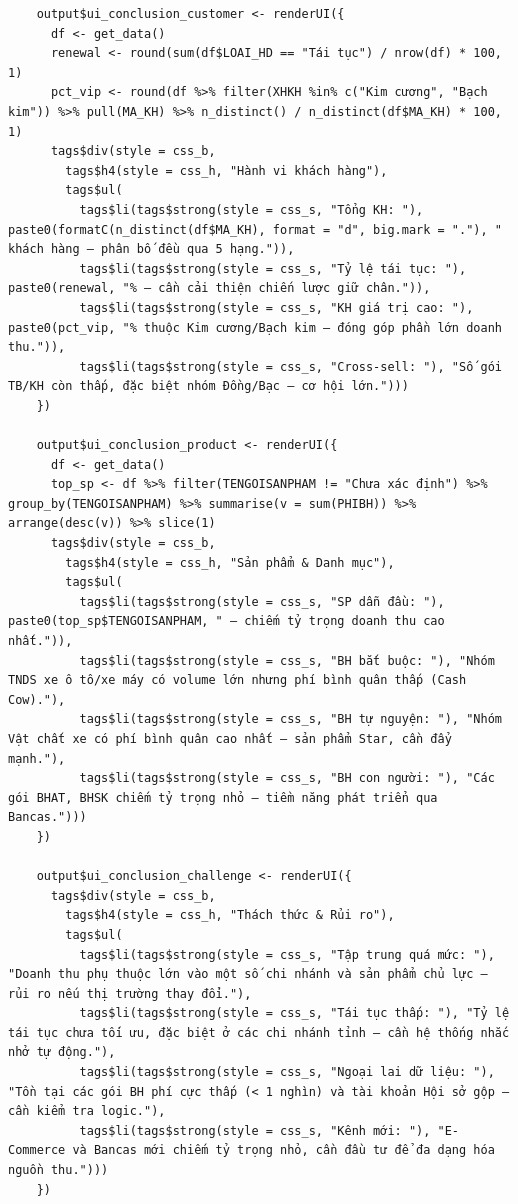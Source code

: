 \documentclass[12pt, a4paper]{article}
\begin{document}
\begin{lstlisting}
    output$ui_conclusion_customer <- renderUI({
      df <- get_data()
      renewal <- round(sum(df$LOAI_HD == "Tái tục") / nrow(df) * 100, 1)
      pct_vip <- round(df %>% filter(XHKH %in% c("Kim cương", "Bạch kim")) %>% pull(MA_KH) %>% n_distinct() / n_distinct(df$MA_KH) * 100, 1)
      tags$div(style = css_b,
        tags$h4(style = css_h, "Hành vi khách hàng"),
        tags$ul(
          tags$li(tags$strong(style = css_s, "Tổng KH: "), paste0(formatC(n_distinct(df$MA_KH), format = "d", big.mark = "."), " khách hàng — phân bố đều qua 5 hạng.")),
          tags$li(tags$strong(style = css_s, "Tỷ lệ tái tục: "), paste0(renewal, "% — cần cải thiện chiến lược giữ chân.")),
          tags$li(tags$strong(style = css_s, "KH giá trị cao: "), paste0(pct_vip, "% thuộc Kim cương/Bạch kim — đóng góp phần lớn doanh thu.")),
          tags$li(tags$strong(style = css_s, "Cross-sell: "), "Số gói TB/KH còn thấp, đặc biệt nhóm Đồng/Bạc — cơ hội lớn.")))
    })

    output$ui_conclusion_product <- renderUI({
      df <- get_data()
      top_sp <- df %>% filter(TENGOISANPHAM != "Chưa xác định") %>% group_by(TENGOISANPHAM) %>% summarise(v = sum(PHIBH)) %>% arrange(desc(v)) %>% slice(1)
      tags$div(style = css_b,
        tags$h4(style = css_h, "Sản phẩm & Danh mục"),
        tags$ul(
          tags$li(tags$strong(style = css_s, "SP dẫn đầu: "), paste0(top_sp$TENGOISANPHAM, " — chiếm tỷ trọng doanh thu cao nhất.")),
          tags$li(tags$strong(style = css_s, "BH bắt buộc: "), "Nhóm TNDS xe ô tô/xe máy có volume lớn nhưng phí bình quân thấp (Cash Cow)."),
          tags$li(tags$strong(style = css_s, "BH tự nguyện: "), "Nhóm Vật chất xe có phí bình quân cao nhất — sản phẩm Star, cần đẩy mạnh."),
          tags$li(tags$strong(style = css_s, "BH con người: "), "Các gói BHAT, BHSK chiếm tỷ trọng nhỏ — tiềm năng phát triển qua Bancas.")))
    })

    output$ui_conclusion_challenge <- renderUI({
      tags$div(style = css_b,
        tags$h4(style = css_h, "Thách thức & Rủi ro"),
        tags$ul(
          tags$li(tags$strong(style = css_s, "Tập trung quá mức: "), "Doanh thu phụ thuộc lớn vào một số chi nhánh và sản phẩm chủ lực — rủi ro nếu thị trường thay đổi."),
          tags$li(tags$strong(style = css_s, "Tái tục thấp: "), "Tỷ lệ tái tục chưa tối ưu, đặc biệt ở các chi nhánh tỉnh — cần hệ thống nhắc nhở tự động."),
          tags$li(tags$strong(style = css_s, "Ngoại lai dữ liệu: "), "Tồn tại các gói BH phí cực thấp (< 1 nghìn) và tài khoản Hội sở gộp — cần kiểm tra logic."),
          tags$li(tags$strong(style = css_s, "Kênh mới: "), "E-Commerce và Bancas mới chiếm tỷ trọng nhỏ, cần đầu tư để đa dạng hóa nguồn thu.")))
    })


\end{lstlisting}
\end{document}
